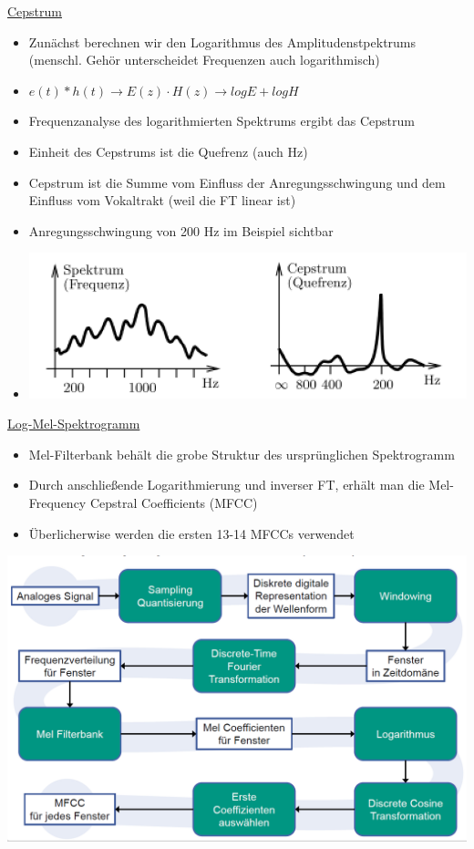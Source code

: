 \documentclass[a4paper,10pt,oneside]{article}
\begin{document}
\underline{Cepstrum} \\
 	\begin{itemize}
 		\item Zunächst berechnen wir den Logarithmus des Amplitudenstpektrums (menschl. Gehör unterscheidet Frequenzen auch logarithmisch)
 		\item $e(t) * h(t) \rightarrow E(z) \cdot H(z) \rightarrow log E + log H$
 		\item Frequenzanalyse des logarithmierten Spektrums ergibt das Cepstrum
 		\item Einheit des Cepstrums ist die Quefrenz (auch Hz)
 		\item Cepstrum ist die Summe vom Einfluss der Anregungsschwingung und dem Einfluss vom Vokaltrakt (weil die FT linear ist)
 		\item Anregungsschwingung von 200 Hz im Beispiel sichtbar
 		\item[] \includegraphics[scale=0.15]{Grafiken/1323.png}
 	\end{itemize}
 	
\underline{Log-Mel-Spektrogramm} \\
	\begin{itemize}
		\item Mel-Filterbank behält die grobe Struktur des ursprünglichen Spektrogramm
		\item Durch anschließende Logarithmierung und inverser FT, erhält man die Mel-Frequency Cepstral Coefficients (MFCC)
		\item Überlicherwise werden die ersten 13-14 MFCCs verwendet
	\end{itemize}	
	
 \includegraphics[scale=0.15]{Grafiken/1325.png}
\end{document}
